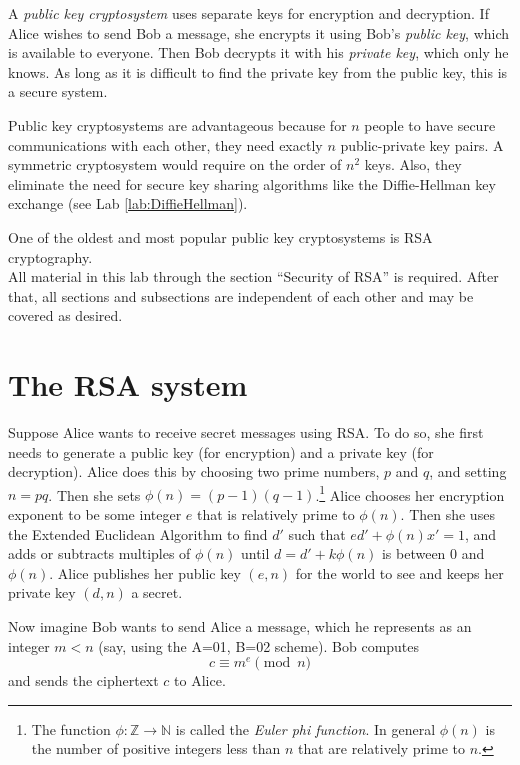 \label{lab:RSA}


A \emph{public key cryptosystem} uses separate keys for encryption and decryption.
If Alice wishes to send Bob a message, she encrypts it using Bob's \emph{public key}, which is available to everyone.
Then Bob decrypts it with his \emph{private key}, which only he knows.
As long as it is difficult to find the private key from the public key, this is a secure system.

Public key cryptosystems are advantageous because for $n$ people to have secure communications with each other, they need exactly $n$ public-private key pairs.
A symmetric cryptosystem would require on the order of $n^2$ keys.
Also, they eliminate the need for secure key sharing algorithms like the Diffie-Hellman key exchange (see Lab \ref{lab:DiffieHellman}).

One of the oldest and most popular public key cryptosystems is RSA cryptography.\\

All material in this lab through the section ``Security of RSA'' is required. 
After that, all sections and subsections are independent of each other and may be covered as desired.

\section*{The RSA system}
Suppose Alice wants to receive secret messages using RSA.
To do so, she first needs to generate a public key (for encryption) and a private key (for decryption).
Alice does this by choosing two prime numbers, $p$ and $q$, and setting $n=pq$.
Then she sets $\phi(n) = (p-1)(q-1)$.\footnote{
The function $\phi: \mathbb{Z} \rightarrow \mathbb{N}$ is called the \emph{Euler phi function}. In general $\phi(n)$ is the number of positive integers less than $n$ that are relatively prime to $n$.}
Alice chooses her encryption exponent to be some integer $e$ that is relatively prime to $\phi(n)$.
Then she uses the Extended Euclidean Algorithm to find $d'$ such that $ed' + \phi(n)x' = 1$, and adds or subtracts multiples of $\phi(n)$ until $d = d'+k\phi(n)$ is between 0 and $\phi(n)$.
Alice publishes her public key $(e, n)$ for the world to see and keeps her private key $(d,n)$ a secret.

Now imagine Bob wants to send Alice a message, which he represents as an integer $m<n$ (say, using the A=01, B=02 scheme).
Bob computes 
\[
c \equiv m^e \pmod{n}
\]
and sends the ciphertext $c$ to Alice.

